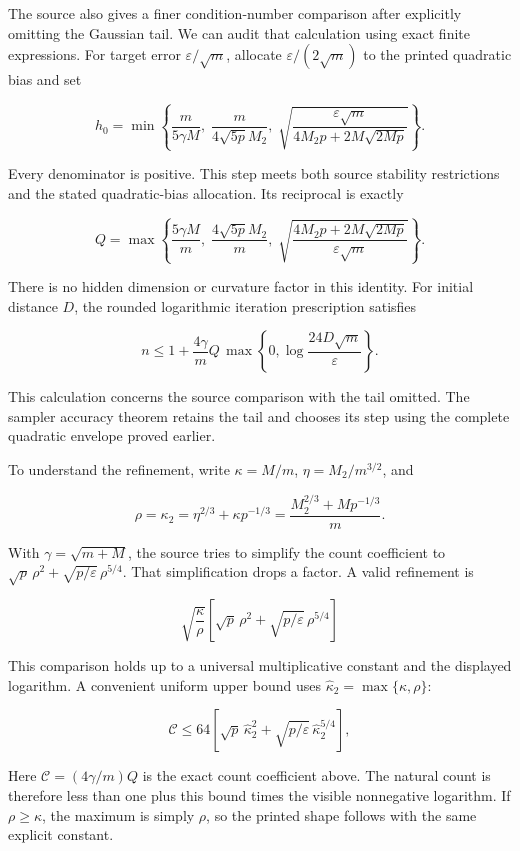 \documentclass[11pt,a4paper]{report}
\begin{document}
The source also gives a finer condition-number comparison after explicitly
omitting the Gaussian tail. We can audit that calculation using exact finite expressions. For target error \(\varepsilon/\sqrt m\), allocate
\(\varepsilon/(2\sqrt m)\) to the printed quadratic bias and set


\[h_0=\min\left\{\frac m{5\gamma M},\;
\frac m{4\sqrt{5p}M_2},\;
\sqrt{\frac{\varepsilon\sqrt m}{4M_2p+2M\sqrt{2Mp}}}\right\}.\]


Every denominator is positive. This step meets both source stability
restrictions and the stated quadratic-bias allocation. Its reciprocal is
exactly


\[Q=\max\left\{\frac{5\gamma M}m,\;
\frac{4\sqrt{5p}M_2}m,\;
\sqrt{\frac{4M_2p+2M\sqrt{2Mp}}{\varepsilon\sqrt m}}\right\}.\]


There is no hidden dimension or curvature factor in this identity. For
initial distance \(D\), the rounded logarithmic iteration prescription satisfies


\[n\le1+\frac{4\gamma}{m}Q\,
\max\left\{0,\log\frac{24D\sqrt m}{\varepsilon}\right\}.\]


This calculation concerns the source comparison with the tail omitted.
The sampler accuracy theorem retains the tail and chooses its step
using the complete quadratic envelope proved earlier.




To understand the refinement, write
\(\kappa=M/m\), \(\eta=M_2/m^{3/2}\), and


\[\rho=\kappa_2=\eta^{2/3}+\kappa p^{-1/3}
=\frac{M_2^{2/3}+Mp^{-1/3}}m.\]


With \(\gamma=\sqrt{m+M}\), the source tries to simplify the count
coefficient to \(\sqrt p\,\rho^2+\sqrt{p/\varepsilon}\,\rho^{5/4}\).
That simplification drops a factor. A valid refinement is


\[\sqrt{\frac\kappa\rho}\left[
\sqrt p\,\rho^2+\sqrt{p/\varepsilon}\,\rho^{5/4}\right]\]


This comparison holds up to a universal multiplicative constant and the displayed logarithm.
A convenient uniform upper bound uses
\(\widehat\kappa_2=\max\{\kappa,\rho\}\):


\[\mathcal C\le64\left[\sqrt p\,\widehat\kappa_2^2+
\sqrt{p/\varepsilon}\,\widehat\kappa_2^{5/4}\right],\]


Here \(\mathcal C=(4\gamma/m)Q\) is the exact count coefficient
above. The natural count is therefore less than one plus this bound times
the visible nonnegative logarithm. If \(\rho\ge\kappa\), the maximum
is simply \(\rho\), so the printed shape follows with the same explicit
constant.
\end{document}
